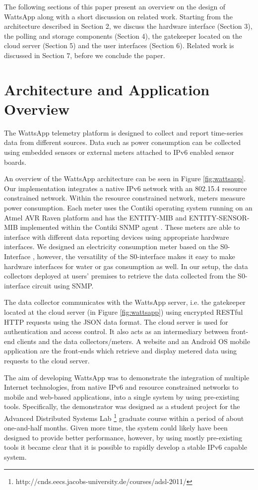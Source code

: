 \documentclass[10pt, conference, compsocconf, english]{IEEEtran}
\begin{document}
The following sections of this paper present an overview on the design
of WattsApp along with a short discussion on related work. Starting
from the architecture described in Section 2, we discuss the hardware
interface (Section 3), the polling and storage components (Section
4), the gatekeeper located on the cloud server (Section 5) and the
user interfaces (Section 6). Related work is discussed in Section
7, before we conclude the paper.


\section{Architecture and Application Overview}

The WattsApp telemetry platform is designed to collect and report
time-series data from different sources. Data such as power consumption
can be collected using embedded sensors or external meters attached
to IPv6 enabled sensor boards.

An overview of the WattsApp architecture can be seen in Figure \ref{fig:wattsapp}.
Our implementation integrates a native IPv6 network with an 802.15.4
resource constrained network. Within the resource constrained network,
meters measure power consumption. Each meter uses the Contiki operating
system \cite{contiki-2} running on an Atmel AVR Raven platform and
has the ENTITY-MIB \cite{rfc4133} and ENTITY-SENSOR-MIB \cite{rfc3433}
implemented within the Contiki SNMP agent \cite{aims-snmp-contiki}.
These meters are able to interface with different data reporting devices
using appropriate hardware interfaces. We designed an electricity
consumption meter based on the S0-Interface \cite{iec62053-31}, however,
the versatility of the S0-interface makes it easy to make hardware
interfaces for water or gas consumption as well. In our setup, the
data collectors deployed at users' premises to retrieve the data collected
from the S0-interface circuit using SNMP.

The data collector communicates with the WattsApp server, i.e. the
gatekeeper located at the cloud server (in Figure \ref{fig:wattsapp})
using encrypted RESTful HTTP requests using the JSON data format.
The cloud server is used for authentication and access control. It
also acts as an intermediary between front-end clients and the data
collectors/meters. A website and an Android OS mobile application
are the front-ends which retrieve and display metered data using requests
to the cloud server.

The aim of developing WattsApp was to demonstrate the integration
of multiple Internet technologies, from native IPv6 and resource constrained
networks to mobile and web-based applications, into a single system
by using pre-existing tools. Specifically, the demonstrator was designed
as a student project for the Advanced Distributed Systems Lab%
\footnote{http://cnds.eecs.jacobs-university.de/courses/adsl-2011/%
} graduate course within a period of about one-and-half months. Given
more time, the system could likely have been designed to provide better
performance, however, by using mostly pre-existing tools it became
clear that it is possible to rapidly develop a stable IPv6 capable
system.
\end{document}
